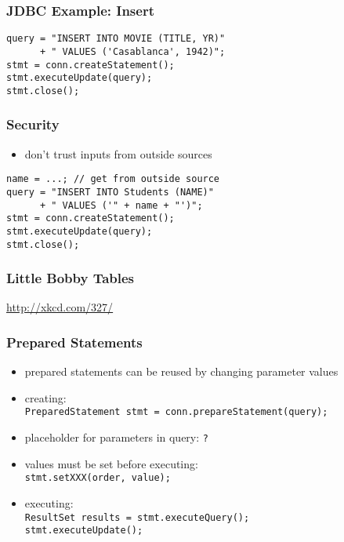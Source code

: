 \documentclass[dvipsnames]{beamer}
\theoremstyle{plain}
\begin{document}
\begin{frame}[fragile]
  \frametitle{JDBC Example: Insert}

  \begin{lstlisting}
query = "INSERT INTO MOVIE (TITLE, YR)"
      + " VALUES ('Casablanca', 1942)";
stmt = conn.createStatement();
stmt.executeUpdate(query);
stmt.close();
  \end{lstlisting}
\end{frame}

\begin{frame}[fragile]
  \frametitle{Security}

  \begin{itemize}
    \item don't trust inputs from outside sources
  \end{itemize}

  \medskip
  \begin{example}
    \begin{lstlisting}
name = ...; // get from outside source
query = "INSERT INTO Students (NAME)"
      + " VALUES ('" + name + "')";
stmt = conn.createStatement();
stmt.executeUpdate(query);
stmt.close();
    \end{lstlisting}
  \end{example}
\end{frame}

\begin{frame}[fragile]
  \frametitle{Little Bobby Tables}

  \begin{center}
  \end{center}
  \url{http://xkcd.com/327/}
\end{frame}

\begin{frame}
  \frametitle{Prepared Statements}

  \begin{itemize}
    \item prepared statements can be reused by changing parameter values

    \medskip
    \item creating:\\
      \lstinline!PreparedStatement stmt = conn.prepareStatement(query);!

    \medskip
    \item placeholder for parameters in query: \lstinline!?!
    \item values must be set before executing:\\
      \lstinline!stmt.setXXX(order, value);!

    \medskip
    \item executing:\\
      \lstinline!ResultSet results = stmt.executeQuery();!\\
      \lstinline!stmt.executeUpdate();!
  \end{itemize}
\end{frame}
\end{document}
